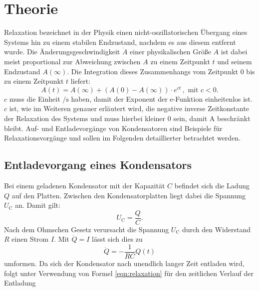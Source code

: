\section{Theorie}
\label{sec:Theorie}
Relaxation bezeichnet in der Physik einen nicht-oszillatorischen Übergang eines Systems hin zu einem stabilen Endzustand, nachdem es aus diesem entfernt wurde.
Die Änderungsgeschwindigkeit $\dot{A}$ einer physikalischen Größe $A$ ist dabei meist proportional zur Abweichung zwischen $A$ zu einem Zeitpunkt $t$ und seinem Endzustand $A(\infty)$.
Die Integration dieses Zusammenhangs vom Zeitpunkt $0$ bis zu einem Zeitpunkt $t$ liefert:
\begin{equation}
	\label{eqn:relaxation}
	A(t)=A(\infty) + ( A(0)-A(\infty) ) \cdot e^{ct}\, ,\,\, \text{mit}\,\, c<0 .
\end{equation}
$c$ muss die Einheit $\si{\per\second}$ haben, damit der Exponent der e-Funktion einheitenlos ist.
$c$ ist, wie im Weiteren genauer erläutert wird, die negative inverse Zeitkonstante der Relaxation des Systems und muss hierbei kleiner $0$ sein, damit A beschränkt bleibt.
Auf- und Entladevorgänge von Kondensatoren sind Beispiele für Relaxationsvorgänge und sollen im Folgenden detaillierter betrachtet werden.
\subsection{Entladevorgang eines Kondensators}
Bei einem geladenen Kondensator mit der Kapazität $C$ befindet sich die Ladung $Q$ auf den Platten.
Zwischen den Kondensatorplatten liegt dabei die Spannung $U_\text{C}$ an. Damit gilt:
\begin{equation*}
	U_\text{C}=\frac{Q}{C}.
\end{equation*}
Nach dem Ohmschen Gesetz verursacht die Spannung $U_{\mathrm{C}}$ durch den Widerstand $R$ einen Strom $I$. Mit $\dot{Q}=I$ lässt sich dies zu
\begin{equation}
	\dot{Q}=-\frac{1}{RC}Q(t)
\end{equation}
umformen.
Da sich der Kondensator nach unendlich langer Zeit entladen wird, folgt unter Verwendung von Formel \eqref{eqn:relaxation} für den zeitlichen Verlauf der Entladung

